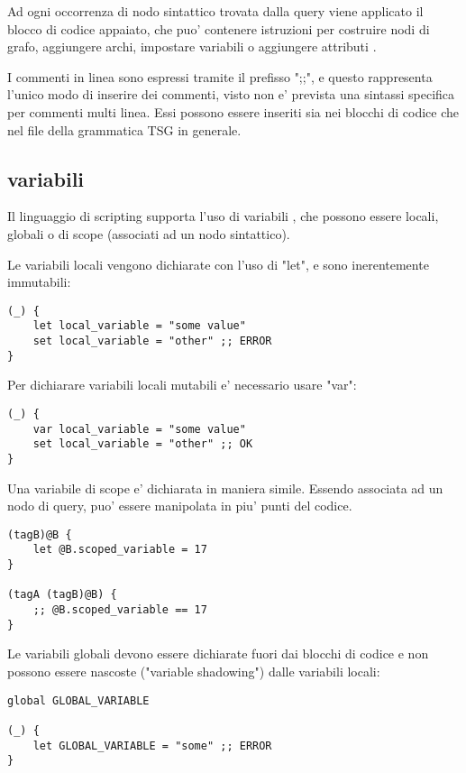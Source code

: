 Ad ogni occorrenza di nodo sintattico trovata dalla query viene applicato il blocco di codice appaiato, che puo' contenere istruzioni per costruire nodi di grafo, aggiungere archi, impostare variabili o aggiungere attributi \cite{TreeSitterGraphReferenceTerminology}.

I commenti in linea sono espressi tramite il prefisso ";;", e questo rappresenta l'unico modo di inserire dei commenti, visto non e' prevista una sintassi specifica per commenti multi linea.
Essi possono essere inseriti sia nei blocchi di codice che nel file della grammatica TSG in generale.

\subsection{variabili}
Il linguaggio di scripting supporta l'uso di variabili \cite{TreeSitterGraphReferenceVariables}, che possono essere locali, globali o di scope (associati ad un nodo sintattico).

Le variabili locali vengono dichiarate con l'uso di "let", e sono inerentemente immutabili:

\begin{Verbatim}[samepage=true]
(_) {
    let local_variable = "some value"
    set local_variable = "other" ;; ERROR
}
\end{Verbatim}

Per dichiarare variabili locali mutabili e' necessario usare "var":

\begin{Verbatim}[samepage=true]
(_) {
    var local_variable = "some value"
    set local_variable = "other" ;; OK
}
\end{Verbatim}

Una variabile di scope e' dichiarata in maniera simile. Essendo associata ad un nodo di query, puo' essere manipolata in piu' punti del codice.

\begin{Verbatim}[samepage=true]
(tagB)@B {
    let @B.scoped_variable = 17
}

(tagA (tagB)@B) {
    ;; @B.scoped_variable == 17
}
\end{Verbatim}

Le variabili globali devono essere dichiarate fuori dai blocchi di codice e non possono essere nascoste ("variable shadowing") dalle variabili locali:

\begin{Verbatim}[samepage=true]
global GLOBAL_VARIABLE

(_) {
    let GLOBAL_VARIABLE = "some" ;; ERROR
}
\end{Verbatim}

